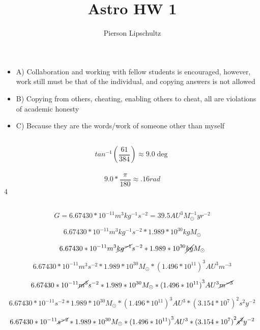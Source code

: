 \documentclass{article}
\title{Astro HW 1}
\author{Pierson Lipschultz}
\begin{document}
\maketitle
\section{}
\subsection{}
\begin{itemize}
    \item A) Collaboration and working with fellow students is encouraged, however, work still must be that of the individual, and copying answers is not allowed 
    \item B) Copying from others, cheating, enabling others to cheat, all are violations of academic honesty
    \item C) Because they are the words/work of someone other than myself
\end{itemize}
\subsection{}

\[tan^{-1}(\frac{61}{384}) \approx 9.0\deg\] \\
\[9.0 * \frac{\pi}{180} \approx .16rad\]4

\subsection{}

\[G = 6.67430 * 10^{-11} m^{3} kg^{-1} s^{-2} = 39.5 AU^{3} M_{\odot}^{-1} yr^{-2}\]

\[6.67430 * 10^{-11} m^{3} kg^{-1} s^{-2} * 1.989 * 10^{30}kg M_{\odot}\]

\[6.67430 * 10^{-11} m^{3} \cancel{kg^{-1}} s^{-2} * 1.989 * 10^{30}\cancel{kg} M_{\odot}\]

\[6.67430 * 10^{-11} m^{3} s^{-2} * 1.989 * 10^{30} M_{\odot} * {(1.496 * 10^{11})}^3 AU^3 m^{-3}\]

\[6.67430 * 10^{-11} \cancel{m^{3}} s^{-2} * 1.989 * 10^{30} M_{\odot} * {(1.496 * 10^{11})}^3 AU^3 \cancel{m^{-3}}\]

\[6.67430 * 10^{-11} s^{-2} * 1.989 * 10^{30} M_{\odot} * {(1.496 * 10^{11})}^3 AU^3 * {(3.154 * 10^7)}^2 s^{2} y^{-2}\] 

\[6.67430 * 10^{-11} \cancel{s^{-2}} * 1.989 * 10^{30} M_{\odot} * {(1.496 * 10^{11})}^3 AU^3 * {(3.154 * 10^7)}^2 \cancel{s^{2}} y^{-2}\] 
\end{document}
